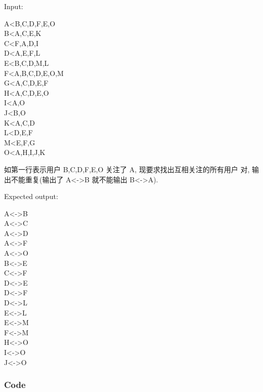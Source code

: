 \documentclass{article}
\begin{document}
    \noindent Input:

    \noindent A<B,C,D,F,E,O \\
    B<A,C,E,K \\
    C<F,A,D,I \\
    D<A,E,F,L \\
    E<B,C,D,M,L \\
    F<A,B,C,D,E,O,M \\
    G<A,C,D,E,F \\
    H<A,C,D,E,O \\
    I<A,O \\
    J<B,O \\
    K<A,C,D \\
    L<D,E,F \\
    M<E,F,G \\
    O<A,H,I,J,K

  如第一行表示用户 B,C,D,F,E,O 关注了 A, 现要求找出互相关注的所有用户
  对, 输出不能重复(输出了 A<->B 就不能输出 B<->A).

    \noindent Expected output:

    \noindent A<->B \\
    A<->C \\
    A<->D \\
    A<->F \\
    A<->O \\
    B<->E \\
    C<->F \\
    D<->E \\
    D<->F \\
    D<->L \\
    E<->L \\
    E<->M \\
    F<->M \\
    H<->O \\
    I<->O \\
    J<->O

    \subsubsection{Code}
\end{document}
